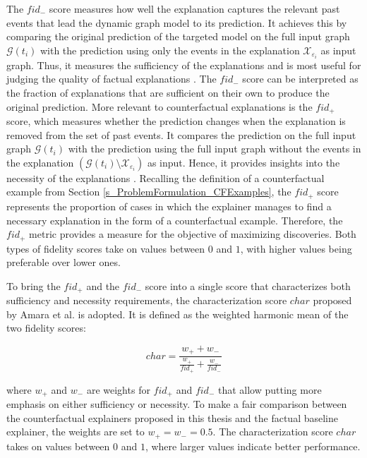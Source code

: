 The $fid_-$ score measures how well the explanation captures the relevant past events that lead the dynamic graph model to its prediction. It achieves this by comparing the original prediction of the targeted model on the full input graph $\mathcal{G}(t_i)$ with the prediction using only the events in the explanation $\mathcal{X}_{\varepsilon_i}$ as input graph. Thus, it measures the sufficiency of the explanations and is most useful for judging the quality of factual explanations \cite{amara_graphframex_2022}. The $fid_-$ score can be interpreted as the fraction of explanations that are sufficient on their own to produce the original prediction. More relevant to counterfactual explanations is the $fid_+$ score, which measures whether the prediction changes when the explanation is removed from the set of past events. It compares the prediction on the full input graph $\mathcal{G}(t_i)$ with the prediction using the full input graph without the events in the explanation $(\mathcal{G}(t_i) \setminus \mathcal{X}_{\varepsilon_i})$ as input. Hence, it provides insights into the necessity of the explanations \cite{amara_graphframex_2022, tan_learning_2022}. Recalling the definition of a counterfactual example from Section \ref{s_ProblemFormulation_CFExamples}, the $fid_+$ score represents the proportion of cases in which the explainer manages to find a necessary explanation in the form of a counterfactual example. Therefore, the $fid_+$ metric provides a measure for the objective of maximizing discoveries. Both types of fidelity scores take on values between $0$ and $1$, with higher values being preferable over lower ones.

To bring the $fid_+$ and the $fid_-$ score into a single score that characterizes both sufficiency and necessity requirements, the characterization score $char$ proposed by Amara et al. \cite{amara_graphframex_2022} is adopted. It is defined as the weighted harmonic mean of the two fidelity scores:

\begin{equation}
    char = \frac{w_+ + w_-}{\frac{w_+}{fid_+} + \frac{w_-}{fid_-}}
\end{equation}

where $w_+$ and $w_-$ are weights for $fid_+$ and $fid_-$ that allow putting more emphasis on either sufficiency or necessity. To make a fair comparison between the counterfactual explainers proposed in this thesis and the factual baseline explainer, the weights are set to $w_+ = w_- = 0.5$. The characterization score $char$ takes on values between $0$ and $1$, where larger values indicate better performance.

